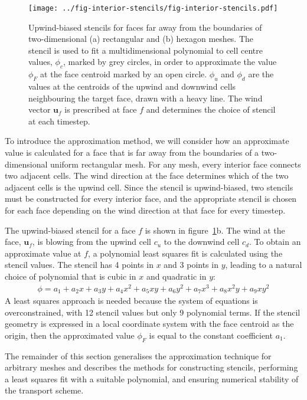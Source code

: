 \begin{figure}
	\centering
	\texttt{[image: ../fig-interior-stencils/fig-interior-stencils.pdf]}
	\caption{Upwind-biased stencils for faces far away from the boundaries of two-dimensional (a) rectangular and (b) hexagon meshes.  The stencil is used to fit a multidimensional polynomial to cell centre values, $\phi_c$, marked by grey circles, in order to approximate the value $\phi_F$ at the face centroid marked by an open circle.  $\phi_u$ and $\phi_d$ are the values at the centroids of the upwind and downwind cells neighbouring the target face, drawn with a heavy line.  The wind vector $\mathbf{u}_f$ is prescribed at face $f$ and determines the choice of stencil at each timestep.}
	\label{fig:interiorStencils}
\end{figure}

To introduce the approximation method, we will consider how an approximate value is calculated for a face that is far away from the boundaries of a two-dimensional uniform rectangular mesh.  For any mesh, every interior face connects two adjacent cells.  The wind direction at the face determines which of the two adjacent cells is the upwind cell.  Since the stencil is upwind-biased, two stencils must be constructed for every interior face, and the appropriate stencil is chosen for each face depending on the wind direction at that face for every timestep.

The upwind-biased stencil for a face $f$ is shown in figure~\ref{fig:interiorStencils}b.  The wind at the face, $\mathbf{u}_f$, is blowing from the upwind cell $c_u$ to the downwind cell $c_d$.
To obtain an approximate value at $f$, a polynomial least squares fit is calculated using the stencil values.
The stencil has \num{4} points in $x$ and \num{3} points in $y$, leading to a natural choice of polynomial that is cubic in $x$ and quadratic in $y$:
\begin{align}
	\phi = a_1 + a_2 x + a_3 y + a_4 x^2 + a_5 xy + a_6 y^2 + a_7 x^3 + a_8 x^2 y + a_9 x y^2 \label{eqn:fullPoly}
\end{align}
A least squares approach is needed because the system of equations is overconstrained, with \num{12} stencil values but only \num{9} polynomial terms.  If the stencil geometry is expressed in a local coordinate system with the face centroid as the origin, then the approximated value $\phi_F$ is equal to the constant coefficient $a_1$.

The remainder of this section generalises the approximation technique for arbitrary meshes and describes the methods for constructing stencils, performing a least squares fit with a suitable polynomial, and ensuring numerical stability of the transport scheme.

